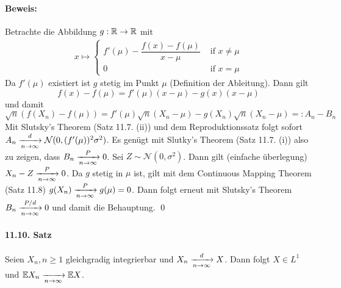\paragraph{Beweis:}Betrachte die Abbildung $g:\mathbb{R}\to\mathbb{R}$ mit 
\begin{align*}
    x\mapsto
\begin{cases}
    f'(\mu)-\dfrac{f(x)-f(\mu)}{x-\mu} &\text{ if }x\neq\mu \\
    0 &\text{ if } x=\mu
\end{cases}
\end{align*}
Da $f'(\mu)$ existiert ist $g$ stetig im Punkt $\mu$ (Definition der Ableitung). Dann gilt 
$$f(x)-f(\mu)=f'(\mu)(x-\mu)-g(x)(x-\mu)$$
und damit
$$\sqrt{n}(f(X_n)-f(\mu))=f'(\mu)\sqrt{n}(X_n-\mu)-g(X_n)\sqrt{n}(X_n-\mu)=:A_n-B_n$$
Mit Slutsky's Theorem (Satz 11.7. (ii)) und dem Reproduktionssatz folgt sofort $A_n\nto{d}{n\to\infty}\mathcal{N}(0,(f'(\mu))^2\sigma^2)$. Es gen\"ugt mit Slutky's Theorem (Satz 11.7. (i)) also zu zeigen, dass $B_n\nto{P}{n\to\infty}0$. \newline\newline
Sei $Z\sim\mathcal{N}(0,\sigma^2)$. Dann gilt (einfache \"uberlegung) $X_n-Z\nto{P}{n\to\infty}0$. Da $g$ stetig in $\mu$ ist, gilt mit dem Continuous Mapping Theorem (Satz 11.8) $g(X_n)\nto{P}{n\to\infty}g(\mu)=0$. Dann folgt erneut mit Slutsky's Theorem $B_n\nto{P/d}{n\to\infty}0$ und damit die Behauptung. \qed

\paragraph{11.10. Satz} Seien $X_n,n\geq 1$ gleichgradig integrierbar und $X_n\nto{d}{n\to\infty}X$. Dann folgt $X\in L^1$ und $\E X_n\nto{}{n\to\infty}\E X$.

